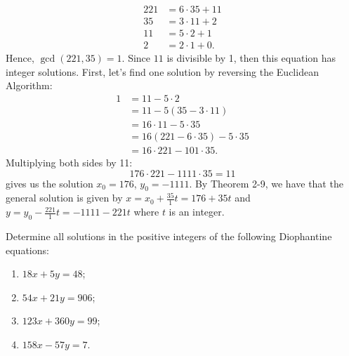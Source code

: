 \begin{solution}
\begin{enumerate}
        \begin{align*}
            221 &= 6\cdot 35 + 11 \\
            35 &= 3 \cdot 11 + 2 \\
            11 &= 5\cdot 2 + 1 \\
            2 &= 2\cdot 1 + 0.
        \end{align*}
        Hence, $\gcd(221, 35) = 1$. Since $11$ is divisible by 1, then this equation has integer solutions. First, let's find one solution by reversing the Euclidean Algorithm:
        \begin{align*}
            1 &= 11 - 5\cdot 2 \\
            &= 11 - 5(35 - 3\cdot 11) \\
            &= 16 \cdot 11 - 5 \cdot 35 \\
            &= 16 (221 - 6\cdot 35) - 5\cdot 35 \\
            &= 16 \cdot 221 - 101 \cdot 35.
        \end{align*}
        Multiplying both sides by 11:
        $$176 \cdot 221 - 1111 \cdot 35 = 11$$
        gives us the solution $x_0 = 176$, $y_0 = -1111$. By Theorem 2-9, we have that the general solution is given by $x = x_0 + \frac{35}{1}t = 176 + 35t$ and $y = y_0 - \frac{221}{1}t = -1111 - 221t$ where $t$ is an integer.
    \end{enumerate}
\end{solution}

\begin{exercise}
    Determine all solutions in the positive integers of the following Diophantine equations:
    \begin{enumerate}
        \item $18x + 5y = 48$;
        \item $54x + 21y = 906$;
        \item $123x + 360y = 99$;
        \item $158x - 57y = 7$.
    \end{enumerate}
\end{exercise}

